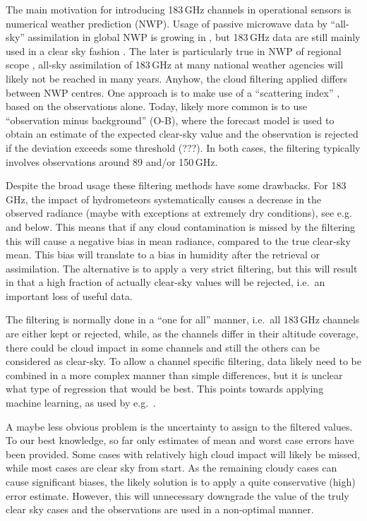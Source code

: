 \documentclass[amt, manuscript]{copernicus}
\begin{document}
The main motivation for introducing 183\,GHz channels in operational sensors is
numerical weather prediction (NWP). Usage of passive microwave data by
``all-sky'' assimilation in global NWP is growing in \citep{geer2017growing},
but 183\,GHz data are still mainly used in a clear sky fashion
\citep{geer2018all}. The later is particularly true in NWP of regional scope
\citep{gustafsson2018survey}, all-sky assimilation of 183\,GHz at many national
weather agencies will likely not be reached in many years. Anyhow, the cloud
filtering applied differs between NWP centres. One approach is to make use of a
``scattering index'' \citep{bennartz2002precipitation}, based on the
observations alone. Today, likely more common is to use ``observation minus
background'' (O-B), where the forecast model is used to obtain an estimate of
the expected clear-sky value and the observation is rejected if the deviation
exceeds some threshold (???). In both cases, the filtering typically involves
observations around 89 and/or 150\,GHz.

Despite the broad usage these filtering methods have some drawbacks. For
183\,GHz, the impact of hydrometeors systematically causes a decrease in the
observed radiance (maybe with exceptions at extremely dry conditions), see
e.g.\ \citet{barlakas:three:20} and below. This means that if any cloud
contamination is missed by the filtering this will cause a negative bias in
mean radiance, compared to the true clear-sky mean. This bias will translate to
a bias in humidity after the retrieval or assimilation. The alternative is to
apply a very strict filtering, but this will result in that a high fraction of
actually clear-sky values will be rejected, i.e.\ an important loss of useful
data.

The filtering is normally done in a ``one for all'' manner, i.e.\ all 183\,GHz
channels are either kept or rejected, while, as the channels differ in their
altitude coverage, there could be cloud impact in some channels and still the
others can be considered as clear-sky. To allow a channel specific filtering,
data likely need to be combined in a more complex manner than simple
differences, but it is unclear what type of regression that would be best. This
points towards applying machine learning, as used by e.g.\
\citet{favrichon2019detecting}.

A maybe less obvious problem is the uncertainty to assign to the filtered
values. To our best knowledge, so far only estimates of mean and worst case
errors have been provided. Some cases with relatively high cloud impact will
likely be missed, while most cases are clear sky from start. As the remaining
cloudy cases can cause significant biases, the likely solution is to apply a
quite conservative (high) error estimate. However, this will unnecessary
downgrade the value of the truly clear sky cases and the observations are used
in a non-optimal manner.
\end{document}
